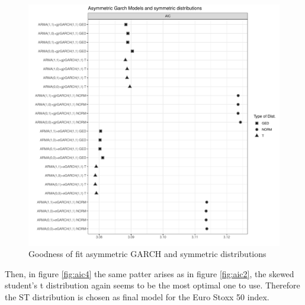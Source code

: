\documentclass[a4paper, nobind]{templates/ociamthesis}
\begin{document}
\begin{figure}[h]

{\centering \includegraphics[width=1\linewidth]{figures/aicfigures/asymmetric aics} 

}

\caption{Goodness of fit asymmetric GARCH and symmetric distributions}\label{fig:aic3}
\end{figure}
\newpage
\clearpage

\noindent Then, in figure \ref{fig:aic4} the same patter arises as in figure \ref{fig:aic2}, the skewed student's t distribution again seems to be the most optimal one to use. Therefore the ST distribution is chosen as final model for the Euro Stoxx 50 index.
\end{document}
